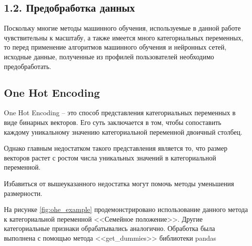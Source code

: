 \subsection{1.2. Предобработка данных}

Поскольку многие методы машинного обучения, используемые в данной работе чувствительны к масштабу, а также имеется много категориальных переменных, то перед применение алгоритмов машинного обучения и нейронных сетей, исходные данные, полученные из профилей пользователей необходимо предобработать.



\subsection*{One Hot Encoding}

One Hot Encoding -- это способ представления категориальных переменных в виде бинарных векторов. Его суть заключается в том, чтобы сопоставить каждому уникальному значению категориальной переменной двоичный столбец. 

Однако главным недостатком такого представления является то, что размер векторов растет с ростом числа уникальных значений в категориальной переменной. 

Избавиться от вышеуказанного недостатка могут помочь методы уменьшения размерности.

На рисунке \ref{fig:ohe_example} продемонстрировано использование данного метода к категориальной переменной <<Семейное положение>>.  Другие категориальные признаки обрабатывались аналогично. Обработка была выполнена с помощью метода <<get\_dummies>> библиотеки pandas \cite{pandas} 

